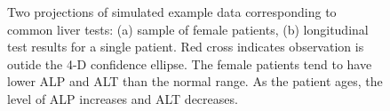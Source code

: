 \documentclass[
  12pt,
]{interact}
\begin{document}
\begin{figure}

\begin{minipage}{0.50\linewidth}



\end{minipage}%
%
\begin{minipage}{0.50\linewidth}



\end{minipage}%

\caption{\label{fig-liver}Two projections of simulated example data
corresponding to common liver tests: (a) sample of female patients, (b)
longitudinal test results for a single patient. Red cross indicates
observation is outide the 4-D confidence ellipse. The female patients
tend to have lower ALP and ALT than the normal range. As the patient
ages, the level of ALP increases and ALT decreases.}

\end{figure}%
\end{document}
